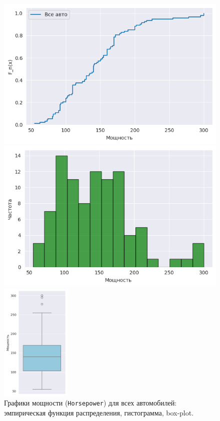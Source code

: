 \documentclass[a4paper,12pt]{article}
\begin{document}
\begin{figure}[H]
    \begin{minipage}{0.49\textwidth}
        \centering
        \includegraphics[width=\textwidth]{images/ecdf_all.png}
    \end{minipage}
    \begin{minipage}{0.49\textwidth}
        \centering
        \includegraphics[width=\textwidth]{images/hist_all.png}
    \end{minipage}
    \begin{minipage}{\textwidth}
        \centering
        \includegraphics[width=0.3\textwidth]{images/boxplot_all.png}
    \end{minipage}
    \centering          
    \caption{Графики мощности (\texttt{Horsepower}) для всех автомобилей: эмпирическая функция распределения, гистограмма, box-plot.}
    \label{fig:allcars}
\end{figure}
\end{document}
